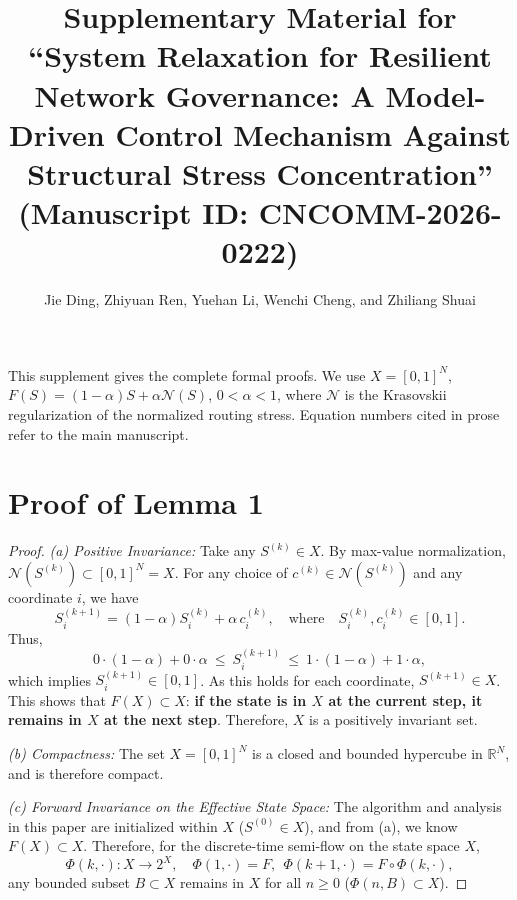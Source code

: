 \documentclass[11pt]{article}
\title{Supplementary Material for ``System Relaxation for Resilient Network Governance: A Model-Driven Control Mechanism Against Structural Stress Concentration'' (Manuscript ID: CNCOMM-2026-0222)}
\author{Jie Ding, Zhiyuan Ren, Yuehan Li, Wenchi Cheng, and Zhiliang Shuai}
\date{}
\newenvironment{IEEEproof}{\begin{proof}}{\end{proof}}
\begin{document}
\maketitle
\noindent This supplement gives the complete formal proofs. We use $X=[0,1]^N$, $F(S)=(1-\alpha)S+\alpha\mathcal N(S)$, $0<\alpha<1$, where $\mathcal N$ is the Krasovskii regularization of the normalized routing stress. Equation numbers cited in prose refer to the main manuscript.

\section{Proof of Lemma 1}
\label{app:proof_lemma_invariance}
\begin{IEEEproof}
\textit{(a) Positive Invariance:}
Take any $S^{(k)}\in X$. By max-value normalization, $\mathcal N(S^{(k)})\subset[0,1]^N=X$. For any choice of $c^{(k)}\in\mathcal N(S^{(k)})$ and any coordinate $i$, we have
\begin{equation}
S^{(k+1)}_i=(1-\alpha)S^{(k)}_i+\alpha\,c^{(k)}_i,
\quad\text{where}\quad S^{(k)}_i,c^{(k)}_i\in[0,1].
\end{equation}
Thus,
\begin{equation}
0\cdot(1-\alpha)+0\cdot\alpha\ \le\ S^{(k+1)}_i\ \le\ 1\cdot(1-\alpha)+1\cdot\alpha,
\end{equation}
which implies $S^{(k+1)}_i\in[0,1]$. As this holds for each coordinate, $S^{(k+1)}\in X$. This shows that $F(X)\subset X$: \textbf{if the state is in $X$ at the current step, it remains in $X$ at the next step}. Therefore, $X$ is a positively invariant set.

\textit{(b) Compactness:}
The set $X=[0,1]^N$ is a closed and bounded hypercube in $\mathbb{R}^N$, and is therefore compact.

\textit{(c) Forward Invariance on the Effective State Space:}
The algorithm and analysis in this paper are initialized within $X$ ($S^{(0)}\in X$), and from (a), we know $F(X)\subset X$. Therefore, for the discrete-time semi-flow on the state space $X$,
\begin{equation}
\Phi(k,\cdot):X\to 2^X,\quad \Phi(1,\cdot)=F,\ \ \Phi(k+1,\cdot)=F\circ\Phi(k,\cdot),
\end{equation}
any bounded subset $B\subset X$ remains in $X$ for all $n\ge 0$ ($\Phi(n,B)\subset X$).


\end{IEEEproof}
\end{document}

